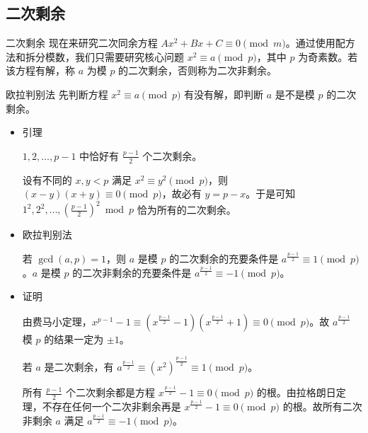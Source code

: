 \documentclass [hyperref={bookmarksdepth=4}, aspectratio=169] {beamer}
\theoremstyle {fy}
\begin{document}
\subsection{二次剩余}

\begin{frame}{二次剩余}
现在来研究二次同余方程 $Ax^2+Bx+C\equiv 0\pmod m$。通过使用配方法和拆分模数，我们只需要研究核心问题 $x^2\equiv a\pmod p$，其中 $p$ 为奇素数。若该方程有解，称 $a$ 为模 $p$ 的二次剩余，否则称为二次非剩余。
\end{frame}

\begin{frame}{欧拉判别法}
先判断方程 $x^2\equiv a\pmod p$ 有没有解，即判断 $a$ 是不是模 $p$ 的二次剩余。

\begin{itemize}
    \item 引理

  $1,2,\dots,p-1$ 中恰好有 $\frac{p-1}{2}$ 个二次剩余。

  设有不同的 $x,y<p$ 满足 $x^2\equiv y^2\pmod p$，则 $(x-y)(x+y)\equiv 0\pmod p$，故必有 $y=p-x$。于是可知 $1^2,2^2,\dots,(\frac{p-1}{2})^2\bmod p$ 恰为所有的二次剩余。

    \item 欧拉判别法

  若 $\gcd(a,p)=1$，则 $a$ 是模 $p$ 的二次剩余的充要条件是 $a^{\frac{p-1}{2}}\equiv 1\pmod p$。$a$ 是模 $p$ 的二次非剩余的充要条件是 $a^{\frac{p-1}{2}}\equiv -1\pmod p$。

    \item 证明

  由费马小定理，$x^{p-1}-1\equiv (x^{\frac{p-1}{2}}-1)(x^{\frac{p-1}{2}}+1)\equiv 0\pmod p$。故 $a^{\frac{p-1}{2}}$ 模 $p$ 的结果一定为 $\pm 1$。

  若 $a$ 是二次剩余，有 $a^{\frac{p-1}{2}}\equiv (x^2)^{\frac{p-1}{2}}\equiv 1\pmod p$。
  
  所有 $\frac{p-1}{2}$ 个二次剩余都是方程 $x^{\frac{p-1}{2}}-1\equiv 0\pmod p$ 的根。由拉格朗日定理，不存在任何一个二次非剩余再是 $x^{\frac{p-1}{2}}-1\equiv 0\pmod p$ 的根。故所有二次非剩余 $a$ 满足 $a^{\frac{p-1}{2}}\equiv -1\pmod p$。
\end{itemize}
\end{frame}
\end{document}

